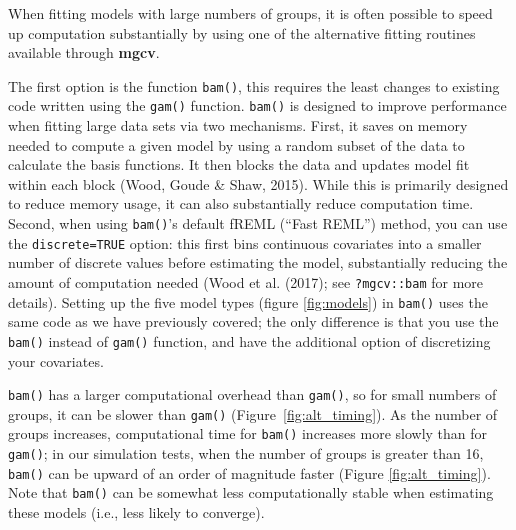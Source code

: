 \documentclass[12pt]{article}
\begin{document}
When fitting models with large numbers of groups, it is often possible
to speed up computation substantially by using one of the alternative
fitting routines available through \textbf{mgcv}.

The first option is the function \texttt{bam()}, this requires the least
changes to existing code written using the \texttt{gam()} function.
\texttt{bam()} is designed to improve performance when fitting large
data sets via two mechanisms. First, it saves on memory needed to
compute a given model by using a random subset of the data to calculate
the basis functions. It then blocks the data and updates model fit
within each block (Wood, Goude \& Shaw, 2015). While this is primarily
designed to reduce memory usage, it can also substantially reduce
computation time. Second, when using \texttt{bam()}'s default fREML
(``Fast REML'') method, you can use the \texttt{discrete=TRUE} option:
this first bins continuous covariates into a smaller number of discrete
values before estimating the model, substantially reducing the amount of
computation needed (Wood et al. (2017); see \texttt{?mgcv::bam} for more
details). Setting up the five model types (figure \ref{fig:models}) in
\texttt{bam()} uses the same code as we have previously covered; the
only difference is that you use the \texttt{bam()} instead of
\texttt{gam()} function, and have the additional option of discretizing
your covariates.

\texttt{bam()} has a larger computational overhead than \texttt{gam()},
so for small numbers of groups, it can be slower than \texttt{gam()}
(Figure~\ref{fig:alt_timing}). As the number of groups increases,
computational time for \texttt{bam()} increases more slowly than for
\texttt{gam()}; in our simulation tests, when the number of groups is
greater than 16, \texttt{bam()} can be upward of an order of magnitude
faster (Figure \ref{fig:alt_timing}). Note that \texttt{bam()} can be
somewhat less computationally stable when estimating these models (i.e.,
less likely to converge).
\end{document}
